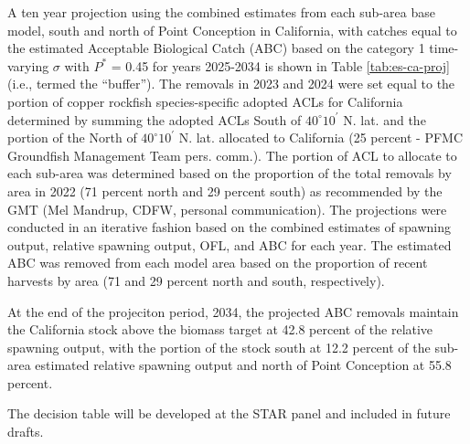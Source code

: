 \documentclass[11pt,
  english,
  letterpaper,
]{article}
\begin{document}
A ten year projection using the combined estimates from each sub-area base model, south and north of Point Conception in California, with catches equal to the estimated Acceptable Biological Catch (ABC) based on the category 1 time-varying \(\sigma\) with \(P^*\) = 0.45 for years 2025-2034 is shown in Table \ref{tab:es-ca-proj} (i.e., termed the ``buffer''). The removals in 2023 and 2024 were set equal to the portion of copper rockfish species-specific adopted ACLs for California determined by summing the adopted ACLs South of $40^\circ 10^\prime$ N. lat. and the portion of the North of $40^\circ 10^\prime$ N. lat. allocated to California (25 percent - PFMC Groundfish Management Team pers. comm.). The portion of ACL to allocate to each sub-area was determined based on the proportion of the total removals by area in 2022 (71 percent north and 29 percent south) as recommended by the GMT (Mel Mandrup, CDFW, personal communication). The projections were conducted in an iterative fashion based on the combined estimates of spawning output, relative spawning output, OFL, and ABC for each year. The estimated ABC was removed from each model area based on the proportion of recent harvests by area (71 and 29 percent north and south, respectively).

At the end of the projeciton period, 2034, the projected ABC removals maintain the California stock above the biomass target at 42.8 percent of the relative spawning output, with the portion of the stock south at 12.2 percent of the sub-area estimated relative spawning output and north of Point Conception at 55.8 percent.

The decision table will be developed at the STAR panel and included in future drafts.

\begingroup\fontsize{10}{12}\selectfont
\end{document}

